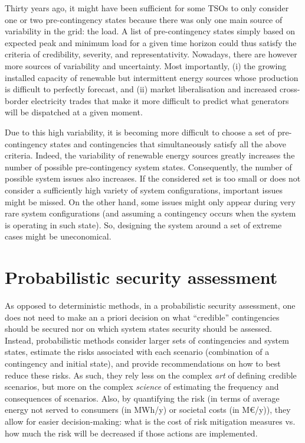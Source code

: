 \begin{itemize}
\begin{itemize}
    \end{itemize}
    Thirty years ago, it might have been sufficient for some TSOs to only consider one or two pre-contingency states because there was only one main source of variability in the grid: the load. A list of pre-contingency states simply based on expected peak and minimum load for a given time horizon could thus satisfy the criteria of credibility, severity, and representativity. Nowadays, there are however more sources of variability and uncertainty. Most importantly, (i) the growing installed capacity of renewable but intermittent energy sources whose production is difficult to perfectly forecast, and (ii) market liberalisation and increased cross-border electricity trades that make it more difficult to predict what generators will be dispatched at a given moment.

    Due to this high variability, it is becoming more difficult to choose a set of pre-contingency states and contingencies that simultaneously satisfy all the above criteria. Indeed, the variability of renewable energy sources greatly increases the number of possible pre-contingency system states. Consequently, the number of possible system issues also increases. If the considered set is too small or does not consider a sufficiently high variety of system configurations, important issues might be missed. On the other hand, some issues might only appear during very rare system configurations (and assuming a contingency occurs when the system is operating in such state). So, designing the system around a set of extreme cases might be uneconomical.
\end{itemize}


\section{Probabilistic security assessment}
\label{sec:probabilisticSecurity}

As opposed to deterministic methods, in a probabilistic security assessment, one does not need to make an a priori decision on what ``credible'' contingencies should be secured nor on which system states security should be assessed. Instead, probabilistic methods consider larger sets of contingencies and system states, estimate the risks associated with each scenario (combination of a contingency and initial state), and provide recommendations on how to best reduce these risks. As such, they rely less on the complex \emph{art} of defining credible scenarios, but more on the complex \emph{science} of estimating the frequency and consequences of scenarios. Also, by quantifying the risk (in terms of average energy not served to consumers (in MWh/y) or societal costs (in M€/y)), they allow for easier decision-making: what is the cost of risk mitigation measures vs. how much the risk will be decreased if those actions are implemented.

